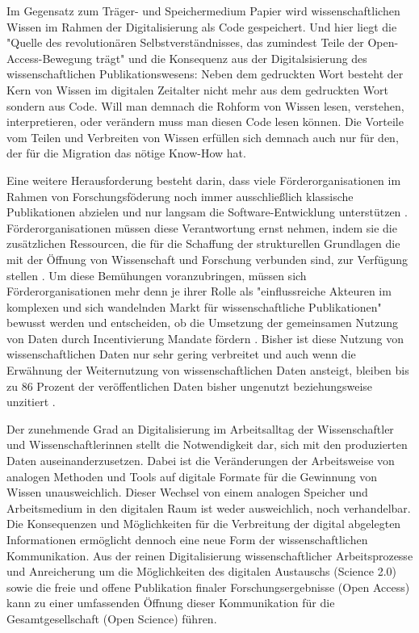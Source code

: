 Im Gegensatz zum Träger- und Speichermedium Papier wird wissenschaftlichen Wissen im Rahmen der Digitalisierung als Code gespeichert. Und hier liegt die "Quelle des revolutionären Selbstverständnisses, das zumindest Teile der Open-Access-Bewegung trägt" und die Konsequenz aus der Digitalsisierung des wissenschaftlichen Publikationswesens: Neben dem gedruckten Wort besteht der Kern von Wissen im digitalen Zeitalter nicht mehr aus dem gedruckten Wort sondern aus Code. Will man demnach die Rohform von Wissen lesen, verstehen, interpretieren, oder verändern muss man diesen Code lesen können. Die Vorteile vom Teilen und Verbreiten von Wissen erfüllen sich demnach auch nur für den, der für die Migration das nötige Know-How hat.

Eine weitere Herausforderung besteht darin, dass viele Förderorganisationen im Rahmen von Forschungsföderung noch immer ausschließlich klassische Publikationen abzielen und nur langsam die Software-Entwicklung unterstützen \cite{hey_2015_open}. Förderorganisationen müssen diese Verantwortung ernst nehmen, indem sie die zusätzlichen Ressourcen, die für die Schaffung der strukturellen Grundlagen die mit der Öffnung von Wissenschaft und Forschung verbunden sind, zur Verfügung stellen \cite{mennes_2013_making_os} \cite{patlak_2010_open}. Um diese Bemühungen voranzubringen, müssen sich Förderorganisationen mehr denn je ihrer Rolle als "einflussreiche  Akteuren  im  komplexen und  sich  wandelnden  Markt  für  wissenschaftliche  Publikationen" \cite{wein_2010_erwerbung} bewusst werden und entscheiden, ob die Umsetzung der gemeinsamen Nutzung von Daten durch Incentivierung Mandate fördern \cite{mennes_2013_making_os}. Bisher ist diese Nutzung von wissenschaftlichen Daten nur sehr gering verbreitet und auch wenn die Erwähnung der Weiternutzung von wissenschaftlichen Daten ansteigt, bleiben bis zu 86 Prozent der veröffentlichen Daten bisher ungenutzt beziehungsweise unzitiert \cite{peters_2015_research}.

Der zunehmende Grad an Digitalisierung im Arbeitsalltag der Wissenschaftler und Wissenschaftlerinnen stellt die Notwendigkeit dar, sich mit den produzierten Daten auseinanderzusetzen. Dabei ist die Veränderungen der Arbeitsweise von analogen Methoden und Tools auf digitale Formate für die Gewinnung von Wissen unausweichlich. Dieser Wechsel von einem analogen Speicher und Arbeitsmedium in den digitalen Raum ist weder ausweichlich, noch verhandelbar. Die Konsequenzen und Möglichkeiten für die Verbreitung der digital abgelegten Informationen ermöglicht dennoch eine neue Form der wissenschaftlichen Kommunikation. Aus der reinen Digitalisierung wissenschaftlicher Arbeitsprozesse und Anreicherung um die Möglichkeiten des digitalen Austauschs (Science 2.0) sowie die freie und offene Publikation finaler Forschungsergebnisse (Open Access) kann zu einer umfassenden Öffnung dieser Kommunikation für die Gesamtgesellschaft (Open Science) führen.


